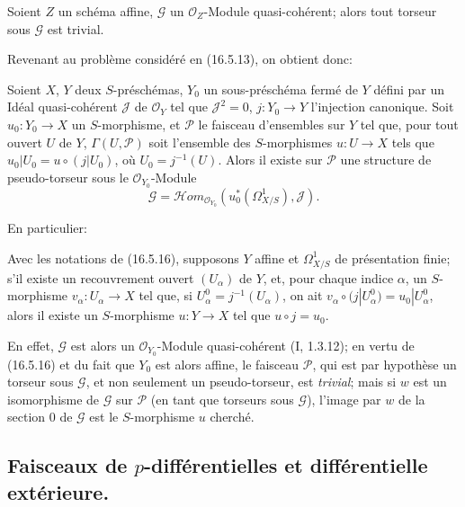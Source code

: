 \begin{proposition}[16.5.16]
\label{IV.16.5.16}
Soient $Z$ un schéma affine, $\mathscr{G}$ un $\mathcal{O}_Z$-Module
quasi-cohérent; alors tout torseur sous $\mathscr{G}$ est trivial.
\end{proposition}

Revenant au problème considéré en (16.5.13), on obtient donc:

\begin{proposition}[16.5.17]
\label{IV.16.5.17}
Soient $X$, $Y$ deux $S$-préschémas, $Y_0$ un sous-préschéma fermé de $Y$
défini par un Idéal quasi-cohérent $\mathscr{J}$ de $\mathcal{O}_Y$ tel que
$\mathscr{J}^2=0$, $j:Y_0\to Y$ l'injection canonique. Soit
$u_0:Y_0\to X$ un $S$-morphisme, et $\mathscr{P}$ le faisceau d'ensembles sur
$Y$ tel que, pour tout ouvert $U$ de $Y$, $\Gamma(U,\mathscr{P})$ soit
l'ensemble des $S$-morphismes $u:U\to X$ tels que
$u_0|U_0=u\circ(j|U_0)$, où $U_0=j^{-1}(U)$. Alors il existe sur
$\mathscr{P}$ une structure de pseudo-torseur sous le
$\mathcal{O}_{Y_0}$-Module
\[
  \mathscr{G}=\mathscr{H}om_{\mathcal{O}_{Y_0}}
  (u_0^*(\Omega_{X/S}^1),\mathscr{J}).
\]
\end{proposition}

En particulier:

\begin{corollary}[16.5.18]
\label{IV.16.5.18}
Avec les notations de (16.5.16), supposons $Y$ affine et $\Omega_{X/S}^1$ de
présentation finie; s'il existe un recouvrement ouvert $(U_\alpha)$ de $Y$,
et, pour chaque indice $\alpha$, un $S$-morphisme $v_\alpha:U_\alpha\to X$
tel que, si $U_\alpha^0=j^{-1}(U_\alpha)$, on ait
$v_\alpha\circ(j|U_\alpha^0)=u_0|U_\alpha^0$, alors il existe un
$S$-morphisme $u:Y\to X$ tel que $u\circ j=u_0$.
\end{corollary}

En effet, $\mathscr{G}$ est alors un $\mathcal{O}_{Y_0}$-Module
quasi-cohérent (I, 1.3.12); en vertu de (16.5.16) et du fait que $Y_0$ est
alors affine, le faisceau $\mathscr{P}$, qui est par hypothèse un torseur sous
$\mathscr{G}$, et non seulement un pseudo-torseur, est \emph{trivial}; mais si
$w$ est un isomorphisme de $\mathscr{G}$ sur $\mathscr{P}$ (en tant que
torseurs sous $\mathscr{G}$), l'image par $w$ de la section 0 de
$\mathscr{G}$ est le $S$-morphisme $u$ cherché.

\subsection{\texorpdfstring{Faisceaux de $p$-différentielles et différentielle extérieure.}{Faisceaux de p-différentielles et différentielle extérieure.}}

